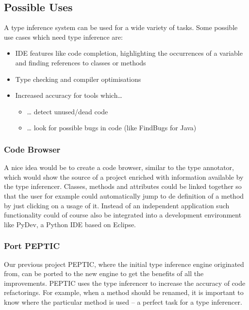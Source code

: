 \documentclass[12pt,halfparskip,DIV11,BCOR10mm]{scrreprt}
\begin{document}
\subsection{Possible Uses}

A type inference system can be used for a wide variety of tasks. Some possible use cases which need type inference are:

\begin{itemize}
    \item IDE features like code completion, highlighting the occurrences of a variable and finding references to classes or methods
    \item Type checking and compiler optimisations
    \item Increased accuracy for tools which…
    \begin{itemize}
        \item … detect unused/dead code
        \item … look for possible bugs in code (like FindBugs for Java)
    \end{itemize}  
\end{itemize}

\subsubsection{Code Browser}

A nice idea would be to create a code browser, similar to the type annotator, which would show the source of a project enriched with information available by the type inferencer. Classes, methods and attributes could be linked together so that the user for example could automatically jump to de definition of a method by just clicking on a usage of it. Instead of an independent application such functionality could of course also be integrated into a development environment like PyDev, a Python IDE based on Eclipse.

\subsubsection{Port PEPTIC}

Our previous project PEPTIC\cite{peptic2}, where the initial type inference engine originated from, can be ported to the new engine to get the benefits of all the improvements. PEPTIC uses the type inferencer to increase the accuracy of code refactorings. For example, when a method should be renamed, it is important to know where the particular method is used – a perfect task for a type inferencer.
\end{document}
